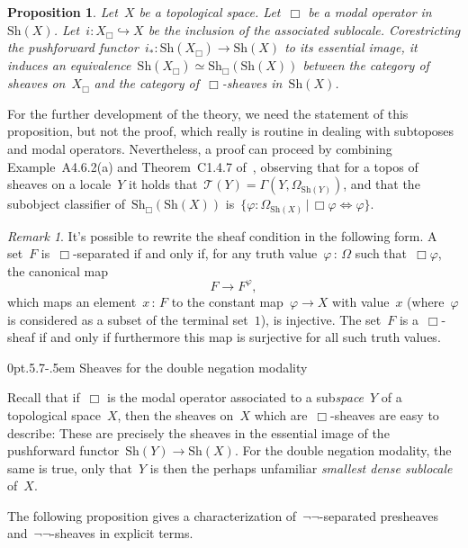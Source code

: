 \documentclass[10pt,reqno,a4paper]{amsbook}
\makeatletter
\theoremstyle{definition}
\theoremstyle{plain}
\newtheorem{prop}[defn]{Proposition}
\theoremstyle{remark}
\newtheorem{rem}[defn]{Remark}
\newcommand{\T}{\mathcal{T}}
\newcommand{\Sh}{\mathrm{Sh}}
\newcommand{\Open}{\T}
\newcommand{\?}{\,{:}\,}
\renewcommand{\_}{\mathpunct{.}\,}
\newcommand{\lra}{\longrightarrow}
\renewenvironment{proof}[1][\proofname]{\par
  \pushQED{\qed}%
  \normalfont \topsep6\p@\@plus6\p@\relax
  \trivlist
  \item[\hskip\labelsep
        \itshape
    #1\@addpunct{.}]\ignorespaces
}{%
  \popQED\endtrivlist\@endpefalse
}
\def\subsection{\@startsection{subsection}{2}%
  {0pt}{.5\linespacing\@plus.7\linespacing}{-.5em}%
  {\normalfont\bfseries}}
\makeatother
\begin{document}
\begin{prop}Let~$X$ be a topological space. Let~$\Box$ be a modal operator
in~$\Sh(X)$. Let~$i : X_\Box \hookrightarrow X$ be the inclusion of the
associated sublocale. Corestricting the pushforward functor~$i_* : \Sh(X_\Box) \to
\Sh(X)$ to its essential image, it induces an equivalence~$\Sh(X_\Box) \simeq
\Sh_\Box(\Sh(X))$ between the category of sheaves on~$X_\Box$ and the category
of~$\Box$-sheaves in~$\Sh(X)$.
\end{prop}
\begin{proof}For the further development of the theory, we need the statement
of this proposition, but not the proof, which really is routine in dealing with
subtoposes and modal operators. Nevertheless, a proof can proceed by
combining Example~A4.6.2(a) and Theorem~C1.4.7
of~\cite{johnstone:elephant}, observing that for a topos of sheaves on a
locale~$Y$ it holds that~$\Open(Y) = \Gamma(Y, \Omega_{\Sh(Y)})$, and that the
subobject classifier of~$\Sh_\Box(\Sh(X))$ is~$\{ \varphi : \Omega_{\Sh(X)} \,|\,
\Box \varphi \Leftrightarrow \varphi \}$.
\end{proof}

\begin{rem}It's possible to rewrite the sheaf condition in the following form.
A set~$F$ is~$\Box$-separated if and only if, for any truth value~$\varphi \?
\Omega$ such that~$\Box\varphi$, the canonical map
\[ F \lra F^\varphi, \]
which maps an element~$x\?F$ to the constant map~$\varphi \to X$ with value~$x$
(where~$\varphi$ is considered as a subset of the terminal set~$1$), is
injective. The set~$F$ is a~$\Box$-sheaf if and only if furthermore this map is
surjective for all such truth values.
\end{rem}


\subsection{Sheaves for the double negation modality}
\label{sect:negneg-sheaves}

Recall that if~$\Box$ is the modal operator associated to a sub\emph{space}~$Y$
of a topological space~$X$, then the sheaves on~$X$ which are~$\Box$-sheaves
are easy to describe: These are precisely the sheaves in the essential image of
the pushforward functor~$\Sh(Y) \to \Sh(X)$. For the double negation modality,
the same is true, only that~$Y$ is then the perhaps unfamiliar \emph{smallest
dense sublocale} of~$X$.

The following proposition gives a characterization of~$\neg\neg$-separated
presheaves and~$\neg\neg$-sheaves in explicit terms.
\end{document}
